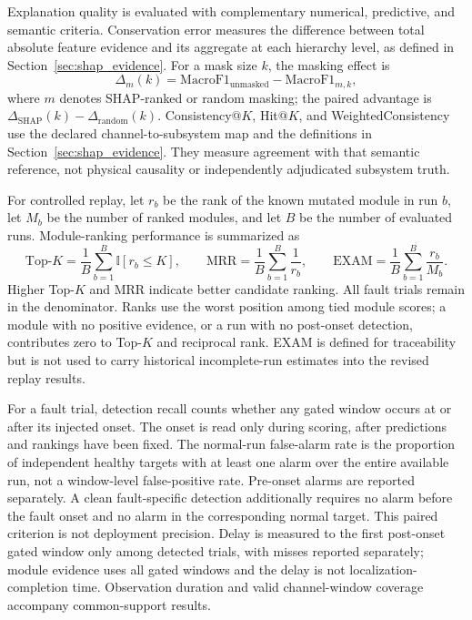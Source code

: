 Explanation quality is evaluated with complementary numerical, predictive, and semantic criteria. Conservation error measures the difference between total absolute feature evidence and its aggregate at each hierarchy level, as defined in Section~\ref{sec:shap_evidence}. For a mask size $k$, the masking effect is
\begin{equation}
\Delta_m(k)=\mathrm{MacroF1}_{\mathrm{unmasked}}-\mathrm{MacroF1}_{m,k},
\label{eq:masking_drop}
\end{equation}
where $m$ denotes SHAP-ranked or random masking; the paired advantage is $\Delta_{\mathrm{SHAP}}(k)-\Delta_{\mathrm{random}}(k)$. Consistency@$K$, Hit@$K$, and WeightedConsistency use the declared channel-to-subsystem map and the definitions in Section~\ref{sec:shap_evidence}. They measure agreement with that semantic reference, not physical causality or independently adjudicated subsystem truth.

For controlled replay, let $r_b$ be the rank of the known mutated module in run $b$, let $M_b$ be the number of ranked modules, and let $B$ be the number of evaluated runs. Module-ranking performance is summarized as
\begin{equation}
\mathrm{Top}\text{-}K=\frac{1}{B}\sum_{b=1}^{B}\mathbb{I}[r_b\leq K],
\qquad
\mathrm{MRR}=\frac{1}{B}\sum_{b=1}^{B}\frac{1}{r_b},
\qquad
\mathrm{EXAM}=\frac{1}{B}\sum_{b=1}^{B}\frac{r_b}{M_b}.
\label{eq:ranking_metrics}
\end{equation}
Higher Top-$K$ and MRR indicate better candidate ranking. All fault trials remain in the denominator. Ranks use the worst position among tied module scores; a module with no positive evidence, or a run with no post-onset detection, contributes zero to Top-$K$ and reciprocal rank. EXAM is defined for traceability but is not used to carry historical incomplete-run estimates into the revised replay results.

For a fault trial, detection recall counts whether any gated window occurs at or after its injected onset. The onset is read only during scoring, after predictions and rankings have been fixed. The normal-run false-alarm rate is the proportion of independent healthy targets with at least one alarm over the entire available run, not a window-level false-positive rate. Pre-onset alarms are reported separately. A clean fault-specific detection additionally requires no alarm before the fault onset and no alarm in the corresponding normal target. This paired criterion is not deployment precision. Delay is measured to the first post-onset gated window only among detected trials, with misses reported separately; module evidence uses all gated windows and the delay is not localization-completion time. Observation duration and valid channel-window coverage accompany common-support results.

